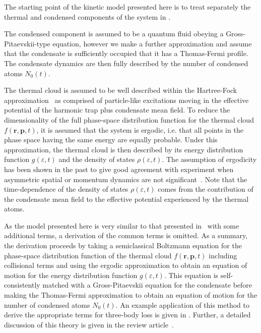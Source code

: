 \parasep

The starting point of the kinetic model presented here is to treat separately the thermal and condensed components of the system in .

The condensed component is assumed to be a quantum fluid obeying a Gross-Pitaevskii-type equation, however we make a further approximation and assume that the condensate is sufficiently occupied that it has a Thomas-Fermi profile.  The condensate dynamics are then fully described by the number of condensed atoms $N_0(t)$.

The thermal cloud is assumed to be well described within the Hartree-Fock approximation~\citep[Chapter 8]{PethickSmith} as comprised of particle-like excitations moving in the effective potential of the harmonic trap plus condensate mean field.  To reduce the dimensionality of the full phase-space distribution function for the thermal cloud $f(\bm{r}, \bm{p}, t)$, it is assumed that the system is ergodic, i.e.  that all points in the phase space having the same energy are equally probable.  Under this approximation, the thermal cloud is then described by its energy distribution function $g(\varepsilon, t)$ and the density of states $\rho(\varepsilon, t)$.  The assumption of ergodicity has been shown in the past to give good agreement with experiment when asymmetric spatial or momentum dynamics are not significant~\citep{Bijlsma:2000,Davis:2000vn}.  Note that the time-dependence of the density of states $\rho(\varepsilon, t)$ comes from the contribution of the condensate mean field to the effective potential experienced by the thermal atoms.


As the model presented here is very similar to that presented in~\citep{Bijlsma:2000} with some additional terms, a derivation of the common terms is omitted. As a summary, the derivation proceeds by taking a semiclassical Boltzmann equation for the phase-space distribution function of the thermal cloud $f(\bm{r}, \bm{p}, t)$ including collisional terms and using the ergodic approximation to obtain an equation of motion for the energy distribution function $g(\varepsilon, t)$. This equation is self-consistently matched with a Gross-Pitaevskii equation for the condensate before making the Thomas-Fermi approximation to obtain an equation of motion for the number of condensed atoms $N_0(t)$. An example application of this method to derive the appropriate terms for three-body loss is given in . Further, a detailed discussion of this theory is given in the review article~\citep{Proukakis:2008}.

